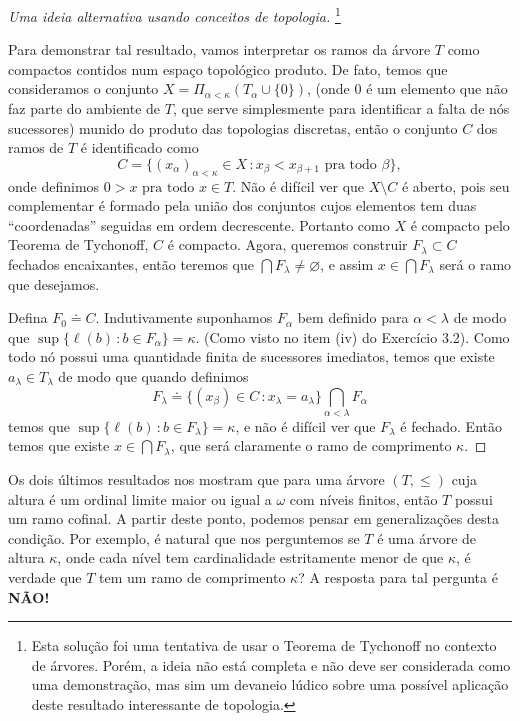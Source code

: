 \documentclass[a4paper]{article}
\begin{document}
    \begin{proof}[Uma ideia alternativa usando conceitos de topologia]
      \footnote{Esta solução foi uma tentativa
    de usar o Teorema de Tychonoff
    no contexto de árvores. Porém, a ideia não está completa e
    não deve ser considerada como uma demonstração, mas sim
    um devaneio lúdico sobre uma possível aplicação deste
    resultado interessante de topologia.}
  
   Para demonstrar tal resultado, vamos interpretar os ramos da árvore \(T\) como
   compactos contidos num espaço topológico produto.
   De fato, temos que consideramos o conjunto \(X=\Pi_{\alpha<\kappa}(T_\alpha\cup\{0\})\),
   (onde \(0\) é um elemento que não faz parte do ambiente de \(T\),
   que serve simplesmente para identificar a falta de nós sucessores) munido do
   produto  das topologias discretas, então o conjunto \(C\) dos ramos de \(T\)
   é identificado como
   \[C=\{(x_\alpha)_{\alpha<\kappa}\in X \,\colon x_\beta<x_{\beta+1}\text{ pra
     todo }\beta\},\] onde definimos \(0>x\text{ pra todo }x\in T\). Não é
 difícil ver que \(X\setminus C\) é aberto, pois seu complementar é formado
 pela união dos conjuntos  cujos elementos tem duas ``coordenadas'' seguidas em
 ordem decrescente.
   Portanto como \(X\) é compacto pelo
   Teorema de Tychonoff, \(C\) é compacto. Agora, queremos construir
   \(F_\lambda\subset C\) fechados encaixantes, então teremos que
   \(\bigcap F_\lambda\neq\varnothing\), e assim \(x\in\bigcap F_\lambda\) será o
   ramo que desejamos.
  
   Defina \(F_0\doteq C\). Indutivamente suponhamos \(F_\alpha\) bem definido
   para \(\alpha<\lambda\) de modo que \mbox{\(\sup\{\ell(b)\,\colon b\in
   F_\alpha\}=\kappa\).} (Como visto no item (iv) do Exercício 3.2).
   Como todo nó possui uma quantidade  finita de sucessores imediatos, temos que
    existe \(a_\lambda\in T_\lambda\) de modo que quando definimos
   \[F_\lambda\doteq\{(x_\beta)\in C\,\colon
     x_\lambda=a_\lambda\}\bigcap_{\alpha<\lambda} F_\alpha\] temos que
   \(\sup\{\ell(b)\,\colon b\in F_\lambda\}=\kappa\), e não é difícil ver que 
   \(F_\lambda\) é fechado. Então temos que existe \(x\in\bigcap F_\lambda\), que
   será claramente o ramo de comprimento \(\kappa\).
  \end{proof}

  Os dois últimos resultados nos mostram que para uma árvore \((T,\leq)\) cuja altura é um
  ordinal limite maior ou igual a \(\omega\) com níveis finitos, então \(T\)
  possui um ramo cofinal. A partir deste ponto, podemos pensar em generalizações
  desta condição. Por exemplo, é natural que nos perguntemos se $T$ é uma árvore
  de altura $\kappa$, onde cada nível tem cardinalidade estritamente menor de
  que \(\kappa\), é verdade que $T$ tem um
  ramo de comprimento $\kappa$?  A resposta para tal pergunta é \textbf{NÃO!}
\end{document}
